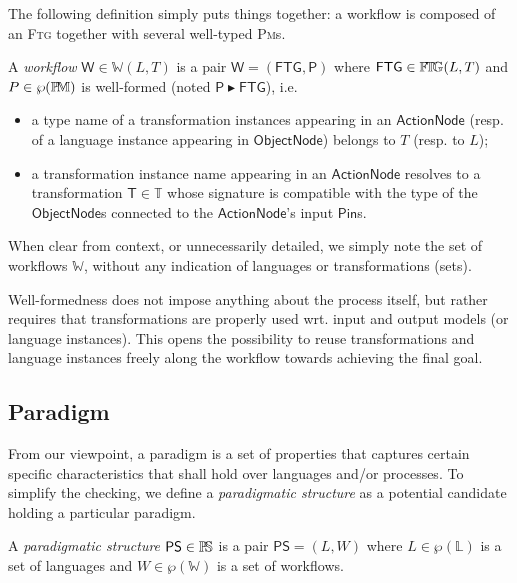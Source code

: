 \medskip
{}

\medskip
The following definition simply puts things together: a workflow is composed of 
an \textsc{Ftg} together with several well-typed \textsc{Pm}s. 

\begin{Definition}[Workflow]
   A \emph{workflow} $\mathsf{W}\in\mathbb{W}(L, T)$ is a pair $\mathsf{W} = 
(\mathsf{FTG}, \mathsf{P})$ where $\mathsf{FTG}\in\mathbb{F}\!\mathbb{T}\!\mathbb{G}(L, T)$ and 
$P\in\wp(\mathbb{P}\!\mathbb{M})$ is well-formed (noted $\mathsf{P} \blacktriangleright 
\mathsf{FTG}$), i.e.
\begin{itemize}
   \item a type name of a transformation instances appearing in an
$\mathsf{ActionNode}$ (resp. of a language instance appearing in 
$\mathsf{ObjectNode}$) belongs to $T$ (resp. to $L$);
   \item a transformation instance name appearing in an $\mathsf{ActionNode}$
resolves to a transformation $\mathsf{T}\in\mathbb{T}$ whose signature is 
compatible with the type of the $\mathsf{ObjectNode}$s 
connected to the $\mathsf{ActionNode}$'s input $\mathsf{Pin}$s. 
\end{itemize}
\end{Definition}
\noindent
When clear from context, or unnecessarily detailed, we simply note the set of 
workflows $\mathbb{W}$, without any indication of languages or 
transformations (sets).

Well-formedness does not impose anything about the process itself, but rather 
requires that transformations are properly used wrt. input and output models 
(or language instances). This opens the possibility to reuse transformations 
and language instances freely along the workflow towards achieving the final 
goal.



\subsection{Paradigm}
\label{sec:PS}

From our viewpoint, a paradigm is a set of properties that captures 
certain specific characteristics that shall hold over languages and/or 
processes. To simplify the checking, we define a \emph{paradigmatic structure} 
as a potential candidate holding a particular paradigm.

\begin{Definition}
   A \emph{paradigmatic structure} $\mathsf{PS}\in \mathbb{P}\!\mathbb{S}$ is a pair $\mathsf{PS} 
= (L, W)$ where $L\in \wp(\mathbb{L})$ is a set of languages and 
$W \in \wp(\mathbb{W})$ is a set of workflows.
\end{Definition}

